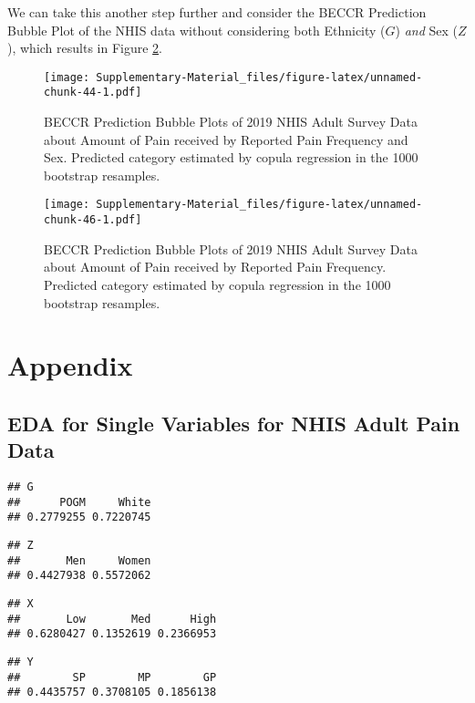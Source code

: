 \documentclass[
]{article}
\begin{document}
We can take this another step further and consider the BECCR Prediction
Bubble Plot of the NHIS data without considering both Ethnicity (\(G\))
\emph{and} Sex (\(Z\)), which results in Figure
\ref{fig:BECCR_NHIS_noZ_noG}.

\begin{figure}
\centering
\texttt{[image: Supplementary-Material\_files/figure-latex/unnamed-chunk-44-1.pdf]}
\caption{\label{fig:BECCR_NHIS_noZ}BECCR Prediction Bubble Plots of 2019
NHIS Adult Survey Data about Amount of Pain received by Reported Pain
Frequency and Sex. Predicted category estimated by copula regression in
the 1000 bootstrap resamples.}
\end{figure}

\begin{figure}
\centering
\texttt{[image: Supplementary-Material\_files/figure-latex/unnamed-chunk-46-1.pdf]}
\caption{\label{fig:BECCR_NHIS_noZ_noG}BECCR Prediction Bubble Plots of
2019 NHIS Adult Survey Data about Amount of Pain received by Reported
Pain Frequency. Predicted category estimated by copula regression in the
1000 bootstrap resamples.}
\end{figure}

\newpage

\section{\texorpdfstring{Appendix \label{A}}{Appendix }}\label{appendix}

\subsection{EDA for Single Variables for NHIS Adult Pain
Data}\label{NHIS_EDA}

\begin{verbatim}
## G
##      POGM     White 
## 0.2779255 0.7220745
\end{verbatim}

\begin{verbatim}
## Z
##       Men     Women 
## 0.4427938 0.5572062
\end{verbatim}

\begin{verbatim}
## X
##       Low       Med      High 
## 0.6280427 0.1352619 0.2366953
\end{verbatim}

\begin{verbatim}
## Y
##        SP        MP        GP 
## 0.4435757 0.3708105 0.1856138
\end{verbatim}
\end{document}
